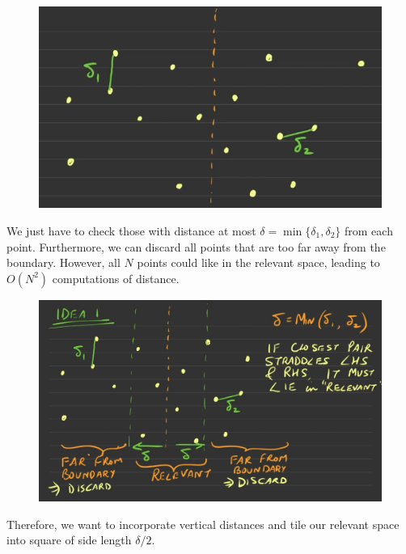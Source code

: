   \begin{figure}[H]
    \centering 
    \includegraphics[scale=0.4]{img/closest_point.png}
    \caption{} 
    \label{fig:closest_point}
  \end{figure}

  We just have to check those with distance at most $\delta = \min\{\delta_1, \delta_2\}$ from each point. Furthermore, we can discard all points that are too far away from the boundary. However, all $N$ points could like in the relevant space, leading to $O(N^2)$ computations of distance. 

  \begin{figure}[H]
    \centering 
    \includegraphics[scale=0.4]{img/cp2.png}
    \caption{} 
    \label{fig:closest_point2}
  \end{figure}

  Therefore, we want to incorporate vertical distances and tile our relevant space into square of side length $\delta/2$.  

